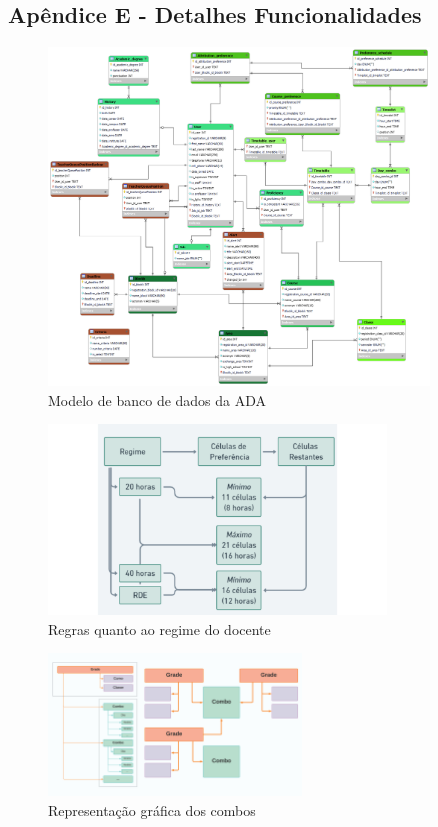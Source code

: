\documentclass[12pt]{article}
\begin{document}
\subsection{Apêndice E - Detalhes Funcionalidades}
\begin{figure}[h]
    \centering
    \includegraphics[width=0.9\textwidth]{modelobanco.png}
    \caption{Modelo de banco de dados da ADA}
    \label{fig:bd}
\end{figure}
\begin{figure}[h]
    \centering
    \includegraphics[width=0.8\textwidth]{regras.png}
    \caption{Regras quanto ao regime do docente}
    \label{fig:bd}
\end{figure}
\begin{figure}[h]
    \centering
    \includegraphics[width=0.6\textwidth]{combos.png}
    \caption{Representação gráfica dos combos}
    \label{fig:bd}
\end{figure}
\end{document}

